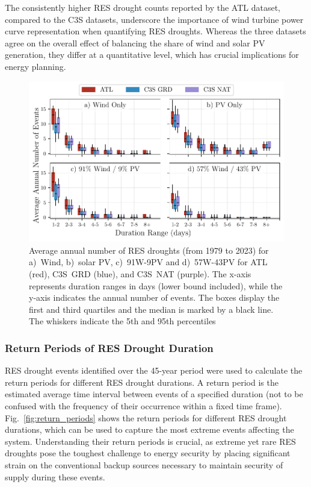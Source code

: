 \documentclass[preprint, 12pt]{elsarticle}
\begin{document}
The consistently higher RES drought counts reported by the ATL dataset, compared to the C3S datasets, underscore the importance of wind turbine power curve representation when quantifying RES droughts. Whereas the three datasets agree on the overall effect of balancing the share of wind and solar PV generation, they differ at a quantitative level, which has crucial implications for energy planning.

\begin{figure}[!ht]
	\centering
	\includegraphics[width=\textwidth]{droughts_number_events.pdf}
	\caption{Average annual number of RES droughts (from 1979 to 2023) for a)~Wind, b)~solar PV, c)~91W-9PV and d)~57W-43PV for ATL (red), C3S~GRD (blue), and C3S~NAT (purple). The x-axis represents duration ranges in days (lower bound included), while the y-axis indicates the annual number of events. The boxes display the first and third quartiles and the median is marked by a black line. The whiskers indicate the 5th and 95th percentiles}
	\label{fig:boxplot_number_events}	
\end{figure}

\subsubsection{Return Periods of RES Drought Duration}

RES drought events identified over the 45-year period were used to calculate the return periods for different RES drought durations. A return period is the estimated average time interval between events of a specified duration (not to be confused with the frequency of their occurrence within a fixed time frame). Fig.~\ref{fig:return_periods} shows the return periods for different RES drought durations, which can be used to capture the most extreme events affecting the system. Understanding their return periods is crucial, as extreme yet rare RES droughts pose the toughest challenge to energy security by placing significant strain on the conventional backup sources necessary to maintain security of supply during these events.
\end{document}
